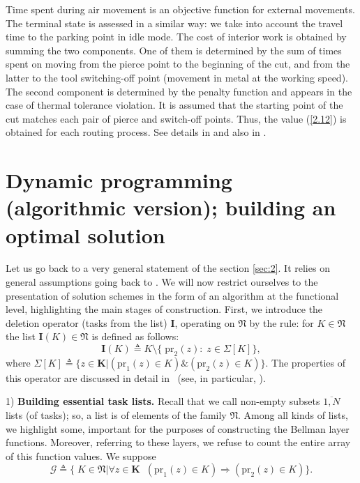 \documentclass[numbers,sort&compress]{IntechOpen-Book}%
\begin{document}
Time spent during air movement
is an
objective function for external movements.
The terminal state is assessed in a similar way:
we take into account the travel time to the parking point
in idle mode.
The cost of interior work
is obtained by summing the two components.
One of them is determined by the sum of times
spent on moving
from the pierce point to the beginning of the cut,
and from the latter to the tool switching-off point
(movement in metal at the working speed).
The second component is determined by the penalty function and
appears in the case of thermal tolerance violation.
It is assumed that the starting point of the cut
matches each pair
of pierce and switch-off points.
Thus,
the value (\ref{2.12})
is obtained
for each routing process.
See details in
\cite[part 1, chapter 3]{4}
and also in
\cite{18}.

\section{%
Dynamic programming
(algorithmic version);
building an optimal solution%
}
\label{sec:4}

Let us go back to a very general statement of the section
\ref{sec:2}.
It relies on general assumptions going back to
\cite[$\S$4.9]{14}.
We will now restrict ourselves to the presentation of
solution schemes
in the form of an algorithm at the functional level,
highlighting the main stages of construction.
First,
we introduce the deletion operator
(tasks from the list)
$\mathbf{I}$,
operating on $\mathfrak{N}$
by the rule:
for
$K \in \mathfrak{N}$
the list
$\mathbf{I}(K) \in \mathfrak{N}$
is defined as follows:
\begin{equation}\label{4.1}
  \mathbf{I}(K) {\triangleq} K \setminus \{\;\mathrm{pr}_2(z):\;z \in \Sigma[K]\},
\end{equation}
where
$\Sigma[K] {\triangleq} \{z \in \mathbf{K} \vert (\mathrm{pr}_1(z) \in K) \& (\mathrm{pr}_2(z) \in K)\}.$
The properties of this operator are discussed in detail in~\cite[part 2]{14}
(see, in particular, \cite[$\S 2.2$]{14}).

1) {\bf Building essential task lists.}
Recall
that we call
non-empty subsets
$ \overline {1, N} $
lists
(of tasks);
so,
a list is of elements of the family
$\mathfrak{N}$.
Among all kinds of lists,
we highlight some,
important for the purposes of constructing the Bellman layer functions.
Moreover,
referring to these layers,
we refuse to count the entire array of
this function values.
We suppose
\begin{equation}\label{4.2}
  \mathcal{G} {\triangleq} \{\;K \in \mathfrak{N} \vert
  \forall{z} \in \mathbf{K}\;\;(\mathrm{pr}_1(z) \in K) \Longrightarrow (\mathrm{pr}_2(z) \in K)\}.
\end{equation}
\end{document}
